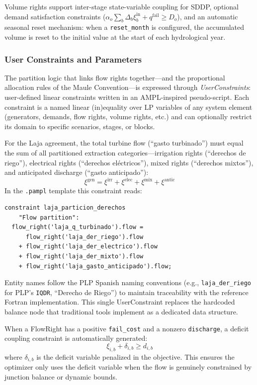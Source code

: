 Volume rights support inter-stage state-variable coupling for SDDP,
optional demand satisfaction constraints
($\alpha_o \sum_b \Delta_b \xi^\text{in}_b + q^\text{fail} \geq D_o$),
and an automatic seasonal reset mechanism: when a
\texttt{reset\_month} is configured, the accumulated volume is reset to
the initial value at the start of each hydrological year.

\subsubsection{User Constraints and Parameters}
\label{sec:user_constraints}

The partition logic that links flow rights together---and the
proportional allocation rules of the Maule Convention---is expressed
through \emph{UserConstraints}: user-defined linear constraints written
in an AMPL-inspired pseudo-script.  Each constraint is a named linear
(in)equality over LP variables of any system element (generators,
demands, flow rights, volume rights, etc.) and can optionally restrict
its domain to specific scenarios, stages, or blocks.

For the Laja agreement, the total turbine flow (``gasto turbinado'')
must equal the sum of all partitioned extraction categories---irrigation
rights (``derechos de riego''), electrical rights (``derechos
el\'ectricos''), mixed rights (``derechos mixtos''), and anticipated
discharge (``gasto anticipado''):
\begin{equation}
\label{eq:uc_partition}
\xi^\text{gen} = \xi^\text{irr} + \xi^\text{elec}
  + \xi^\text{mix} + \xi^\text{antic}
\end{equation}
In the \texttt{.pampl} template this constraint reads:
\begin{verbatim}
constraint laja_particion_derechos
    "Flow partition":
  flow_right('laja_q_turbinado').flow =
      flow_right('laja_der_riego').flow
    + flow_right('laja_der_electrico').flow
    + flow_right('laja_der_mixto').flow
    + flow_right('laja_gasto_anticipado').flow;
\end{verbatim}

Entity names follow the PLP Spanish naming conventions (e.g.,
\texttt{laja\_der\_riego} for PLP's \texttt{IQDR}, ``Derecho de
Riego'') to maintain traceability with the reference Fortran
implementation.  This single UserConstraint replaces the hardcoded
balance node that traditional tools implement as a dedicated data
structure.

When a FlowRight has a positive \texttt{fail\_cost} and a nonzero
\texttt{discharge}, a deficit coupling constraint is automatically
generated:
\begin{equation}
\label{eq:deficit_coupling}
\xi_{i,b} + \delta_{i,b} \geq d_{i,b}
\end{equation}
where $\delta_{i,b}$ is the deficit variable penalized in the
objective.  This ensures the optimizer only uses the deficit
variable when the flow is genuinely constrained by junction
balance or dynamic bounds.

